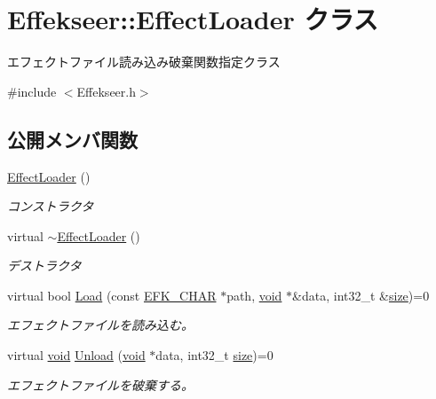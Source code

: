 \hypertarget{class_effekseer_1_1_effect_loader}{}\section{Effekseer\+:\+:Effect\+Loader クラス}
\label{class_effekseer_1_1_effect_loader}


エフェクトファイル読み込み破棄関数指定クラス  




{\ttfamily \#include $<$Effekseer.\+h$>$}

\subsection*{公開メンバ関数}
\begin{DoxyCompactItemize}
\item 
\mbox{\hyperlink{class_effekseer_1_1_effect_loader_a38e316829c64864d3a0cac68cd7724a0}{Effect\+Loader}} ()
\begin{DoxyCompactList}\small\item\em コンストラクタ \end{DoxyCompactList}\item 
virtual \mbox{\hyperlink{class_effekseer_1_1_effect_loader_a2d296c85473ebb6cae68be5305759628}{$\sim$\+Effect\+Loader}} ()
\begin{DoxyCompactList}\small\item\em デストラクタ \end{DoxyCompactList}\item 
virtual bool \mbox{\hyperlink{class_effekseer_1_1_effect_loader_a2da2924e84118ae31330f5d3c2937f29}{Load}} (const \mbox{\hyperlink{_effekseer_8h_a50b026abea014b47854bcd835b3b6233}{E\+F\+K\+\_\+\+C\+H\+AR}} $\ast$path, \mbox{\hyperlink{namespace_effekseer_ab34c4088e512200cf4c2716f168deb56}{void}} $\ast$\&data, int32\+\_\+t \&\mbox{\hyperlink{namespace_effekseer_a73c68f3d33539d30844b9d1e058077f7}{size}})=0
\begin{DoxyCompactList}\small\item\em エフェクトファイルを読み込む。 \end{DoxyCompactList}\item 
virtual \mbox{\hyperlink{namespace_effekseer_ab34c4088e512200cf4c2716f168deb56}{void}} \mbox{\hyperlink{class_effekseer_1_1_effect_loader_a6c033478a92355db775a2bfa9e3b6115}{Unload}} (\mbox{\hyperlink{namespace_effekseer_ab34c4088e512200cf4c2716f168deb56}{void}} $\ast$data, int32\+\_\+t \mbox{\hyperlink{namespace_effekseer_a73c68f3d33539d30844b9d1e058077f7}{size}})=0
\begin{DoxyCompactList}\small\item\em エフェクトファイルを破棄する。 \end{DoxyCompactList}\end{DoxyCompactItemize}


